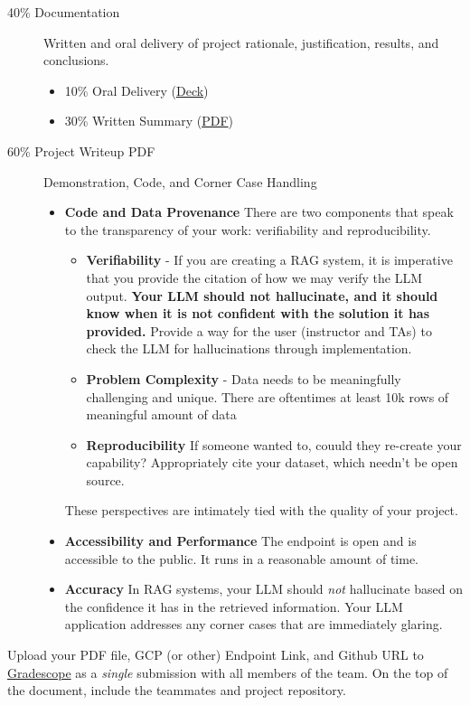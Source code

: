 \documentclass[paper=a4, fontsize=11pt]{scrartcl} %
\begin{document}
\begin{description}
    \item[40\% Documentation] Written and oral delivery of project rationale, justification, results, and conclusions. 
    \begin{itemize}
        \item 10\% Oral Delivery %
        (\href{https://docs.google.com/presentation/d/1THS63CCLEqvzfadkNAwDTP2hCg9bLNnt9LdAo7dUWNc/edit?slide=id.p1#slide=id.p1}{Deck})
        \item 30\% Written Summary (\href{https://www.overleaf.com/project/67d700c6739786050017acaa}{PDF})
    \end{itemize}
    \item[60\% Project Writeup PDF]  Demonstration, Code, and Corner Case Handling
    \begin{itemize}
        \item \textbf{Code and Data Provenance} There are two components that speak to the transparency of your work: verifiability and reproducibility. 

        \begin{itemize}
            \item \textbf{Verifiability} - If you are creating a RAG system, it is imperative that you provide the citation of how we may verify the LLM output. \textbf{Your LLM should not hallucinate, and it should know when it is not confident with the solution it has provided.} Provide a way for the user (instructor and TAs) to check the LLM for hallucinations through implementation. 

            \item \textbf{Problem Complexity} - Data needs to be meaningfully challenging and unique. There are oftentimes at least 10k rows of meaningful amount of data

            \item \textbf{Reproducibility} If someone wanted to, couuld they re-create your capability? Appropriately cite your dataset, which needn't be open source.
        \end{itemize}
        These perspectives are intimately tied with the quality of your project. 
        \item \textbf{Accessibility and Performance} The endpoint is open and is accessible to the public. It runs in a reasonable amount of time.
        \item \textbf{Accuracy} In RAG systems, your LLM should \emph{not} hallucinate based on the confidence it has in the retrieved information. Your LLM application addresses any corner cases that are immediately glaring.
    \end{itemize}
\end{description}

Upload your PDF file, GCP (or other) Endpoint Link, and Github URL to \href{https://www.gradescope.com}{Gradescope} as a \emph{single} submission with all members of the team. On the top of the document, include the teammates and project repository. 
\end{document}
